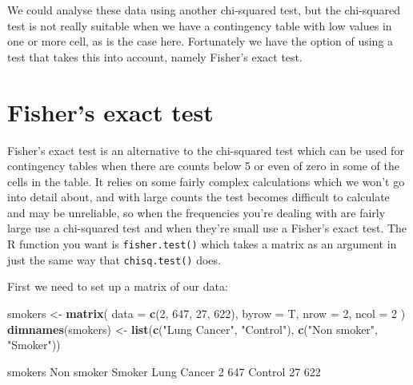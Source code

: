 \documentclass[
]{book}
\newenvironment{Shaded}{\begin{snugshade}}{\end{snugshade}}
\newcommand{\DataTypeTok}[1]{\textcolor[rgb]{0.13,0.29,0.53}{#1}}
\newcommand{\DecValTok}[1]{\textcolor[rgb]{0.00,0.00,0.81}{#1}}
\newcommand{\KeywordTok}[1]{\textcolor[rgb]{0.13,0.29,0.53}{\textbf{#1}}}
\newcommand{\NormalTok}[1]{#1}
\newcommand{\StringTok}[1]{\textcolor[rgb]{0.31,0.60,0.02}{#1}}
\begin{document}
We could analyse these data using another chi-squared test, but the chi-squared test is not really suitable when we have a contingency table with low values in one or more cell, as is the case here. Fortunately we have the option of using a test that takes this into account, namely Fisher's exact test.

\hypertarget{fishers-exact-test}{%
\section{Fisher's exact test}\label{fishers-exact-test}}

Fisher's exact test is an alternative to the chi-squared test which can be used for contingency tables when there are counts below 5 or even of zero in some of the cells in the table. It relies on some fairly complex calculations which we won't go into detail about, and with large counts the test becomes difficult to calculate and may be unreliable, so when the frequencies you're dealing with are fairly large use a chi-squared test and when they're small use a Fisher's exact test. The R function you want is \texttt{fisher.test()} which takes a matrix as an argument in just the same way that \texttt{chisq.test()} does.

First we need to set up a matrix of our data:

\begin{Shaded}
\begin{Highlighting}[]
\NormalTok{smokers <-}\StringTok{ }\KeywordTok{matrix}\NormalTok{(}
  \DataTypeTok{data =} \KeywordTok{c}\NormalTok{(}\DecValTok{2}\NormalTok{, }\DecValTok{647}\NormalTok{, }\DecValTok{27}\NormalTok{, }\DecValTok{622}\NormalTok{),}
  \DataTypeTok{byrow =}\NormalTok{ T,}
  \DataTypeTok{nrow =} \DecValTok{2}\NormalTok{,}
  \DataTypeTok{ncol =} \DecValTok{2}
\NormalTok{)}
\KeywordTok{dimnames}\NormalTok{(smokers) <-}
\StringTok{  }\KeywordTok{list}\NormalTok{(}\KeywordTok{c}\NormalTok{(}\StringTok{"Lung Cancer"}\NormalTok{, }\StringTok{"Control"}\NormalTok{), }\KeywordTok{c}\NormalTok{(}\StringTok{"Non smoker"}\NormalTok{, }\StringTok{"Smoker"}\NormalTok{))}
\end{Highlighting}
\end{Shaded}

\begin{Shaded}
\begin{Highlighting}[]
\NormalTok{smokers}
\NormalTok{            Non smoker Smoker}
\NormalTok{Lung Cancer          }\DecValTok{2}    \DecValTok{647}
\NormalTok{Control             }\DecValTok{27}    \DecValTok{622}
\end{Highlighting}
\end{Shaded}
\end{document}
